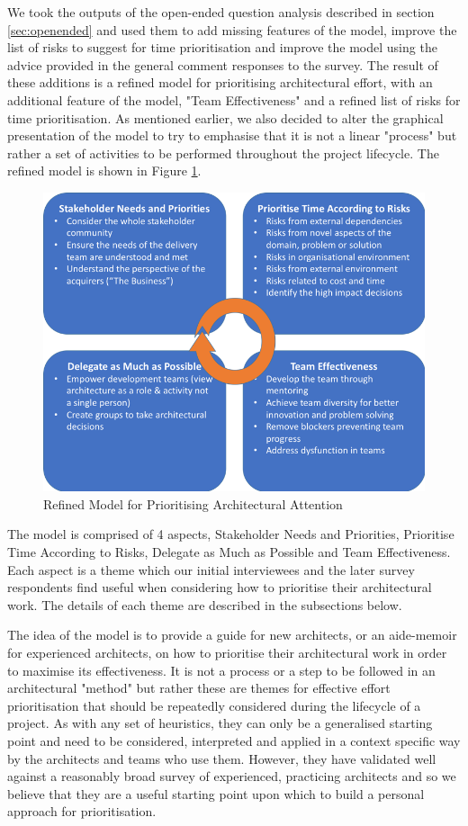 We took the outputs of the open-ended question analysis described in section \ref{sec:openended} and used them to add missing features of the model, improve the list of risks to suggest for time prioritisation and improve the model using the advice provided in the general comment responses to the survey.
The result of these additions is a refined model for prioritising architectural effort, with an additional feature of the model, "Team Effectiveness" and a refined list of risks for time prioritisation.  As mentioned earlier, we also decided to alter the graphical presentation of the model to try to emphasise that it is not a linear "process" but rather a set of activities to be performed throughout the project lifecycle.  The refined model is shown in Figure \ref{figure:refinedmodel}.

\begin{figure}
\centering
\includegraphics[width=12cm]{Figures/prioritisation-refined-model}
\caption{Refined Model for Prioritising Architectural Attention}
\label{figure:refinedmodel}
\end{figure}

The model is comprised of 4 aspects, Stakeholder Needs and Priorities, Prioritise Time According to Risks, Delegate as Much as Possible and Team Effectiveness.  Each aspect is a theme which our initial interviewees and the later survey respondents find useful when considering how to prioritise their architectural work.  The details of each theme are described in the subsections below. 

The idea of the model is to provide a guide for new architects, or an aide-memoir for experienced architects, on how to prioritise their architectural work in order to maximise its effectiveness.  It is not a process or a step to be followed in an architectural "method" but rather these are themes for effective effort prioritisation that should be repeatedly considered during the lifecycle of a project.
As with any set of heuristics, they can only be a generalised starting point and need to be considered, interpreted and applied in a context specific way by the architects and teams who use them.  However, they have validated well against a reasonably broad survey of experienced, practicing architects and so we believe that they are a useful starting point upon which to build a personal approach for prioritisation.

